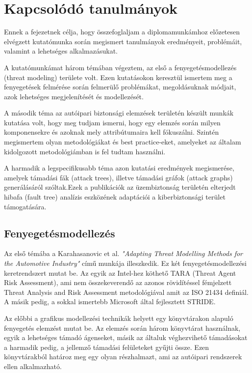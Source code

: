 \chapter{Kapcsolódó tanulmányok}
Ennek a fejezetnek célja, hogy összefoglaljam a diplomamunkámhoz előzetesen elvégzett kutatómunka során megismert tanulmányok eredményeit, problémáit, valamint a lehetséges alkalmazásukat.

A kutatómunkámat három témában végeztem, az első a fenyegetésmodellezés (threat modeling) területe volt. Ezen kutatásokon keresztül ismertem meg a fenyegetések felmérése során felmerülő problémákat, megoldásuknak módjait, azok lehetséges megjelenítését és modellezését.

A második téma az autóipari biztonsági elemzések területén készült munkák kutatása volt, hogy meg tudjam ismerni, hogy egy elemzés során milyen komponensekre és azoknak mely attribútumaira kell fókuszálni. Szintén megismertem olyan metodológiákat és best practice-eket, amelyeket az általam kidolgozott metodológiámban is fel tudtam használni.

A harmadik a legspecifikusabb téma azon kutatási eredmények megismerése, amelyek támadási fák (attack trees), illetve támadási gráfok (attack graphs) generálásáról szóltak.Ezek a publikációk az üzembiztonság területén elterjedt hibafa (fault tree) analízis eszközének adaptációi a kiberbiztonsági terület támogatására.

\section{Fenyegetésmodellezés}

Az első témába  a Karahasanovic et al. \cite{Karahasanovic} \textit{"Adapting Threat Modelling Methods for the Automotive Industry"} című munkája illeszkedik. Ez két fenyegetésmodellezési keretrendszert mutat be. Az egyik az Intel-hez köthető TARA (Threat Agent Risk Assessment), ami nem összekeverendő az azonos rövidítéssel fémjelzett Threat Analysis and Risk Assessment metodológiával amit az ISO 21434 definiál. A másik pedig, a sokkal ismertebb Microsoft által fejlesztett STRIDE. 

Az előbbi a grafikus modellezési technikák helyett egy könyvtárakon alapuló fenyegetés elemzést mutat be. Az elemzés során három könyvtárat használnak, egyik a lehetséges támadó ágenseket, másik az általuk véghezvihető támadásokat a harmadik pedig, a jellemző támadási felületeket gyűjti össze. Ezen könyvtárakból határoz meg egy olyan részhalmazt, ami az autóipari rendszerek ellen alkalmazható. 

